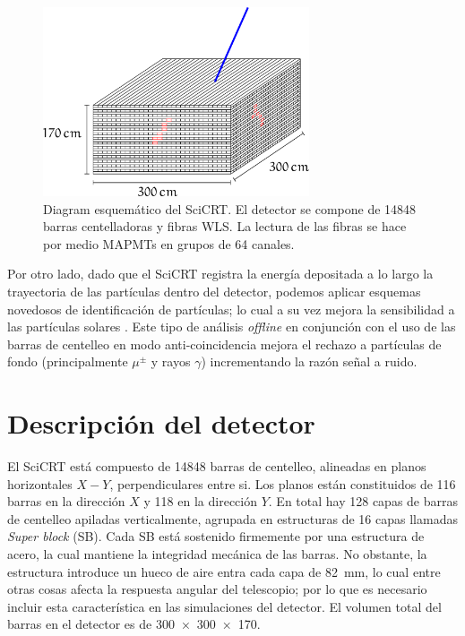 \begin{figure}
        \centering
        \includegraphics[width=0.7\textwidth]{scibar-diagram.pdf}
        \caption{Diagram esquemático del SciCRT. El detector se compone de \num{14848} barras centelladoras y fibras WLS. La lectura de las fibras se hace por medio MAPMTs en grupos de \num{64} canales.}
        \label{fig:scibar-detector}
\end{figure}

Por otro lado, dado que el SciCRT registra la energía depositada a lo largo la trayectoria de las partículas dentro del detector, podemos aplicar esquemas novedosos de identificación de partículas; lo cual a su vez mejora la sensibilidad a las partículas solares \cite{garcia20}. Este tipo de análisis \emph{offline} en conjunción con el uso de las barras de centelleo en modo anti-coincidencia mejora el rechazo a partículas de fondo (principalmente $\mu^{\pm}$ y rayos $\gamma$) incrementando la razón señal a ruido.

\section{Descripción del detector}

El SciCRT está compuesto de \num{14848} barras de centelleo, alineadas en planos horizontales $X-Y$, perpendiculares entre si. Los planos están constituidos de \num{116} barras en la dirección $X$ y \num{118} en la dirección $Y$. En total hay \num{128} capas de barras de centelleo apiladas verticalmente, agrupada en estructuras de \num{16} capas llamadas \emph{Super block} (SB). Cada SB está sostenido firmemente por una estructura de acero, la cual mantiene la integridad mecánica de las barras. No obstante, la estructura introduce un hueco de aire entra cada capa de \SI{82}{\mm}, lo cual entre otras cosas afecta la respuesta angular del telescopio; por lo que es necesario incluir esta característica en las simulaciones del detector. El volumen total del barras en el detector es de \SI[product-units=power]{300x300x170}{\cm\cubic}.

